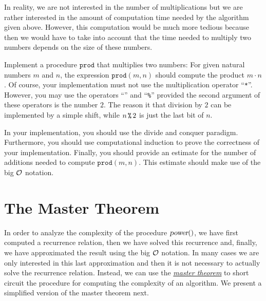 \remark
In reality, we are not interested in the number of multiplications but we are rather interested
in the amount of computation time needed by the algorithm given above.
However, this computation would be much more tedious because then we would have to take into account
that the time needed to multiply two numbers depends on the size of these numbers.

\exercise
Implement a procedure $\mathtt{prod}$ that multiplies two numbers:
For given natural numbers $m$ and $n$, the expression $\mathtt{prod}(m, n)$  should compute the product
$m\cdot n$.  Of course, your implementation must not use the multiplication operator ``\texttt{*}''.
However, you may use the operators ``\texttt{}'' and ``\texttt{\%}'' provided
the second argument of these
operators is the number $2$.  The reason it that division by $2$ can be implemented by a simple
shift, while $n\, \texttt{\symbol{37}}\, 2$ is just the last bit of $n$.

In your implementation, you should use the
divide and conquer paradigm.  Furthermore, you should use computational induction to prove the
correctness of your implementation.  Finally, you should provide an estimate for the number of
additions needed to compute $\mathtt{prod}(m,n)$.  This estimate should make use of the big $\mathcal{O}$
notation. 
\eox
\pagebreak


\section{The Master Theorem}
In order to analyze the complexity of  the procedure $\textsl{power}()$,
we have first computed a  recurrence relation, then we have solved this recurrence and, finally,  
we have approximated the result using the big $\mathcal{O}$ notation.  In many cases we are only interested in this
last approximation and then it is not necessary to actually solve the recurrence relation.  
Instead, we can use the 
\href{http://en.wikipedia.org/wiki/Master_theorem#Generic_form}{\emph{master theorem}} to short
circuit the procedure for computing the complexity of an algorithm. 
We present a simplified version of the master theorem next.

